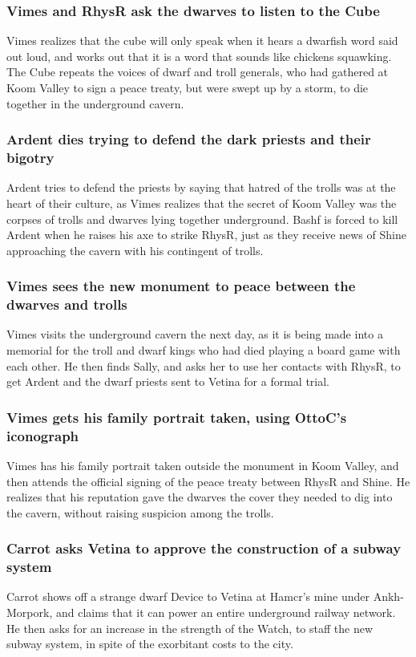 \subsubsection{\Gls{Vimes} and \Gls{RhysR} ask the dwarves to listen to the Cube}
\Gls{Vimes} realizes that the cube will only speak when it hears a dwarfish word said out loud, and
works out that it is a word that sounds like chickens squawking. The Cube repeats the voices of
dwarf and troll generals, who had gathered at Koom Valley to sign a peace treaty, but were swept up
by a storm, to die together in the underground cavern.

\subsubsection{\Gls{Ardent} dies trying to defend the dark priests and their bigotry}
\Gls{Ardent} tries to defend the priests by saying that hatred of the trolls was at the heart of
their culture, as \Gls{Vimes} realizes that the secret of Koom Valley was the corpses of trolls and
dwarves lying together underground. \Gls{Bashf} is forced to kill \Gls{Ardent} when he raises his
axe to strike \Gls{RhysR}, just as they receive news of \Gls{Shine} approaching the cavern with his
contingent of trolls.

\subsubsection{\Gls{Vimes} sees the new monument to peace between the dwarves and trolls}
\Gls{Vimes} visits the underground cavern the next day, as it is being made into a memorial for
the troll and dwarf kings who had died playing a board game with each other. He then finds
\Gls{Sally}, and asks her to use her contacts with \Gls{RhysR}, to get \Gls{Ardent} and the dwarf
priests sent to \Gls{Vetina} for a formal trial.

\subsubsection{\Gls{Vimes} gets his family portrait taken, using \Gls{OttoC}'s iconograph}
\Gls{Vimes} has his family portrait taken outside the monument in Koom Valley, and then attends the
official signing of the peace treaty between \Gls{RhysR} and \Gls{Shine}. He realizes that his
reputation gave the dwarves the cover they needed to dig into the cavern, without raising suspicion
among the trolls.

\subsubsection{\Gls{Carrot} asks \Gls{Vetina} to approve the construction of a subway system}
\Gls{Carrot} shows off a strange dwarf Device to \Gls{Vetina} at \Gls{Hamcr}'s mine under
Ankh-Morpork, and claims that it can power an entire underground railway network. He then asks for
an increase in the strength of the Watch, to staff the new subway system, in spite of the exorbitant
costs to the city.